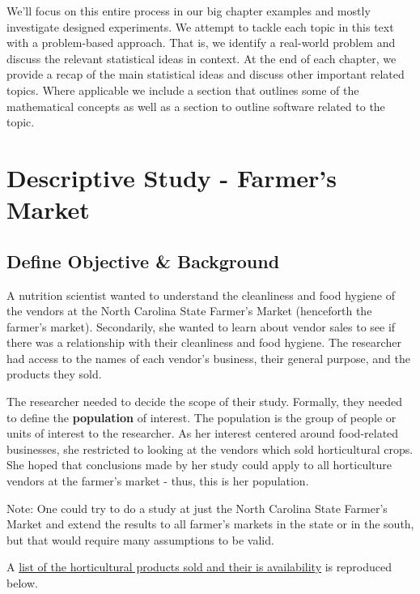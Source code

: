 \documentclass[
]{book}
\theoremstyle{definition}
\theoremstyle{definition}
\theoremstyle{definition}
\theoremstyle{remark}
\begin{document}
We'll focus on this entire process in our big chapter examples and mostly investigate designed experiments. We attempt to tackle each topic in this text with a problem-based approach. That is, we identify a real-world problem and discuss the relevant statistical ideas in context. At the end of each chapter, we provide a recap of the main statistical ideas and discuss other important related topics. Where applicable we include a section that outlines some of the mathematical concepts as well as a section to outline software related to the topic.

\hypertarget{descriptive-study---farmers-market}{%
\section{Descriptive Study - Farmer's Market}\label{descriptive-study---farmers-market}}

\hypertarget{define-objective-background}{%
\subsection{Define Objective \& Background}\label{define-objective-background}}

A nutrition scientist wanted to understand the cleanliness and food hygiene of the vendors at the North Carolina State Farmer's Market (henceforth the farmer's market). Secondarily, she wanted to learn about vendor sales to see if there was a relationship with their cleanliness and food hygiene. The researcher had access to the names of each vendor's business, their general purpose, and the products they sold.

The researcher needed to decide the scope of their study. Formally, they needed to define the \textbf{population} of interest. The population is the group of people or units of interest to the researcher. As her interest centered around food-related businesses, she restricted to looking at the vendors which sold horticultural crops. She hoped that conclusions made by her study could apply to all horticulture vendors at the farmer's market - thus, this is her population.

Note: One could try to do a study at just the North Carolina State Farmer's Market and extend the results to all farmer's markets in the state or in the south, but that would require many assumptions to be valid.

A \href{http://www.ncagr.gov/markets/chart.htm}{list of the horticultural products sold and their is availability} is reproduced below.
\end{document}
